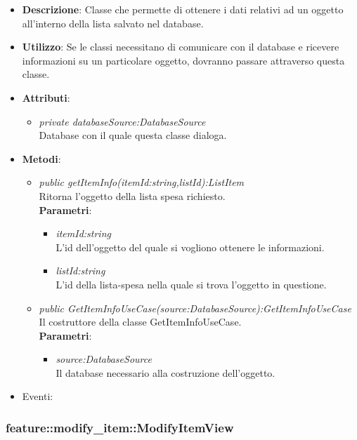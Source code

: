 \begin{itemize}
\item \textbf{Descrizione}: Classe che permette di ottenere i dati relativi ad un oggetto all'interno della lista salvato nel database.
\item \textbf{Utilizzo}: Se le classi necessitano di comunicare con il database e ricevere informazioni su un particolare oggetto, dovranno passare attraverso questa classe.
\item \textbf{Attributi}: 
	\begin{itemize}
	\item \textit{private databaseSource:DatabaseSource}\\
	Database con il quale questa classe dialoga.
	\end{itemize}
\item \textbf{Metodi}:
	\begin{itemize}
	\item \textit{public getItemInfo(itemId:string,listId):ListItem}\\
	Ritorna l'oggetto della lista spesa richiesto.
			\\ \textbf{Parametri}: \begin{itemize}
			\item \textit{itemId:string}\\
			L'id dell'oggetto del quale si vogliono ottenere le informazioni.
			\item \textit{listId:string}\\
			L'id della lista-spesa nella quale si trova l'oggetto in questione.
			\end{itemize} 
			\item \textit{public GetItemInfoUseCase(source:DatabaseSource):GetItemInfoUseCase}\\
			Il costruttore della classe GetItemInfoUseCase.
				\\ \textbf{Parametri}: \begin{itemize}
				\item \textit{source:DatabaseSource}\\
				Il database necessario alla costruzione dell'oggetto.
			\end{itemize} 
	\end{itemize}
\item{Eventi}:
\end{itemize}

\subsubsection{feature::modify\_item::ModifyItemView}

